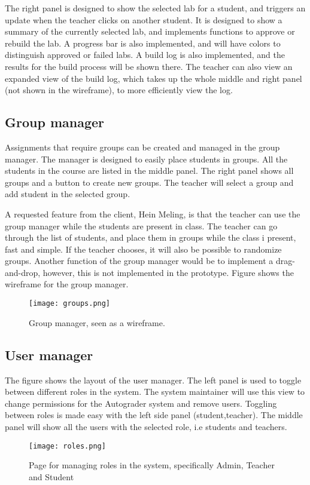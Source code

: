 The right panel is designed to show the selected lab for a student, and triggers an update when the teacher clicks on another student. It is designed to show a summary of the currently selected lab, and implements functions to approve or rebuild the lab. A progress bar is also implemented, and will have colors to distinguish approved or failed labs. A build log is also implemented, and the results for the build process will be shown there. The teacher can also view an expanded view of the build log, which takes up the whole middle and right panel (not shown in the wireframe), to more efficiently view the log.

\subsection{Group manager}

Assignments that require groups can be created and managed in the group manager. The manager is designed to easily place students in groups. All the students in the course are listed in the middle panel. The right panel shows all groups and a button to create new groups. The teacher will select a group and add student in the selected group.

A requested feature from the client, Hein Meling, is that the teacher can use the group manager while the students are present in class. The teacher can go through the list of students, and place them in groups while the class i present, fast and simple. If the teacher chooses, it will also be possible to randomize groups. Another function of the group manager would be to implement a drag-and-drop, however, this is not implemented in the prototype. Figure  shows the wireframe for the group manager.

\begin{figure}[h!]
	 \centering
   \texttt{[image: groups.png]}
   \caption{Group manager, seen as a wireframe.}
   \label{fig:Wireframes for the new Autograder front-end}
\end{figure}

\subsection{User manager}

The figure  shows the layout of the user manager. The left panel is used to toggle between different roles in the system. The system maintainer will use this view to change permissions for the Autograder system and remove users. Toggling between roles is made easy with the left side panel (student,teacher). The middle panel will show all the users with the selected role, i.e students and teachers.

\begin{figure}[h!]
	 \centering
   \texttt{[image: roles.png]}
   \caption{Page for managing roles in the system, specifically Admin, Teacher and Student}
   \label{fig:Wireframes for the new Autograder front-end}
\end{figure}






